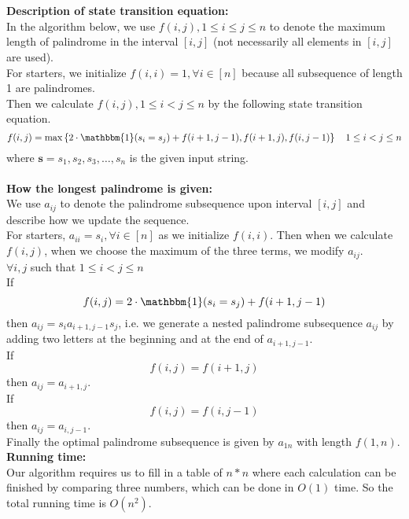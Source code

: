 \documentclass[12pt,letterpaper]{article}
\begin{document}
\newpage
\section{}
\textbf{Description of state transition equation:}\\
In the algorithm below, we use $f(i,j),1\leq i\leq j\leq n$ to denote the maximum length of palindrome in the interval $[i,j]$
(not necessarily all elements in $[i,j]$ are used).\\
\newline
For starters,
we initialize $f(i,i)=1,\forall i\in[n]$ 
because all subsequence of length 1 are palindromes.\\
Then we calculate $f(i,j),1\leq i<j\leq n$ by the following state transition equation.
$$f(i,j)=\max\left\{2\cdot\mathbbm{1}(s_i=s_j)+f(i+1,j-1),f(i+1,j),f(i,j-1)\right\} \quad 1\leq i<j\leq n$$
where $\boldsymbol{s}=s_1,s_2,s_3,\dots,s_n$ is the given input string.
\\\\
\textbf{How the longest palindrome is given:}\\
We use $a_{ij}$ to denote the palindrome subsequence upon interval $[i,j]$
and describe how we update the sequence.\\
For starters, $a_{ii}=s_i,\forall i\in[n]$ as we initialize $f(i,i)$.
Then when we calculate $f(i,j)$, 
when we choose the maximum of the three terms, 
we modify $a_{ij}$.\\
$\forall i,j$ such that $1\leq i<j\leq n$\\
If $$f(i,j)=2\cdot\mathbbm{1}(s_i=s_j)+f(i+1,j-1)$$
then $a_{ij}=s_ia_{i+1,j-1}s_j$,
i.e. we generate a nested palindrome subsequence $a_{ij}$
by adding two letters at the beginning and at the end of $a_{i+1,j-1}$.\\
If $$f(i,j)=f(i+1,j)$$
then $a_{ij}=a_{i+1,j}.$\\
If $$f(i,j)=f(i,j-1)$$
then $a_{ij}=a_{i,j-1}.$\\
Finally the optimal palindrome subsequence is given by $a_{1n}$ with length $f(1,n)$.\\
\textbf{Running time:}\\
Our algorithm requires us to fill in a table of $n*n$ where each calculation can be finished 
by comparing three numbers, 
which can be done in $O(1)$ time.
So the total running time is $O(n^2)$.

\newpage
\section{}
\end{document}
